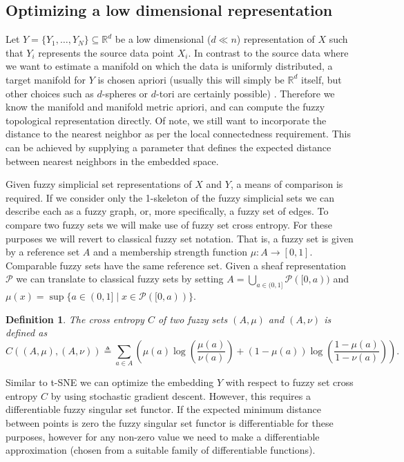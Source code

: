 \documentclass[12pt]{article}
\newtheorem{defn}{Definition}
\begin{document}
\subsection{Optimizing a low dimensional representation}\label{graph_layout_derivation}

Let $Y = \{Y_1,\ldots,Y_N\} \subseteq \mathbb{R}^d$ be a low dimensional ($d \ll n$) representation of $X$ such that $Y_i$ represents the source data point $X_i$. In contrast to the source data where we want to estimate a manifold on which the data is uniformly distributed, a target manifold for $Y$ is chosen apriori (usually this will simply be $\mathbb{R}^d$ itself, but other choices such as $d$-spheres or $d$-tori are certainly possible) . Therefore we know the manifold and manifold metric apriori, and can compute the fuzzy topological representation directly. Of note, we still want to incorporate the distance to the nearest neighbor as per the local connectedness requirement. This can be achieved by supplying a parameter that defines the expected distance between nearest neighbors in the embedded space.

Given fuzzy simplicial set representations of $X$ and $Y$, a means of comparison is required. If we consider only the 1-skeleton of the fuzzy simplicial sets we can describe each as a fuzzy graph, or, more specifically, a fuzzy set of edges. To compare two fuzzy sets we will make use of fuzzy set cross entropy. For these purposes we will revert to classical fuzzy set notation. That is, a fuzzy set is given by a reference set $A$ and a membership strength function $\mu:A\to[0,1]$. Comparable fuzzy sets have the same reference set. Given a sheaf representation $\mathscr{P}$ we can translate to classical fuzzy sets by setting $A = \bigcup_{a\in(0,1]} \mathscr{P}([0,a))$ and $\mu(x) = \sup \{a\in (0, 1] \mid x \in \mathscr{P}([0, a))\}$. 

\begin{defn}
The cross entropy $C$ of two fuzzy sets $(A, \mu)$ and $(A, \nu)$ is defined as
\[
C((A, \mu), (A, \nu)) \triangleq \sum_{a\in A} \left(\mu(a)\log\left(\frac{\mu(a)}{\nu(a)}\right)
     + (1 - \mu(a))\log\left(\frac{1 - \mu(a)}{1 - \nu(a)}\right)\right) .
\]
\end{defn}

Similar to t-SNE we can optimize the embedding $Y$ with respect to fuzzy set cross entropy $C$ by using stochastic gradient descent. However, this requires a differentiable fuzzy singular set functor. If the expected minimum distance between points is zero the fuzzy singular set functor is differentiable for these purposes, however for any non-zero value we need to make a differentiable approximation (chosen from a suitable family of differentiable functions).
\end{document}
